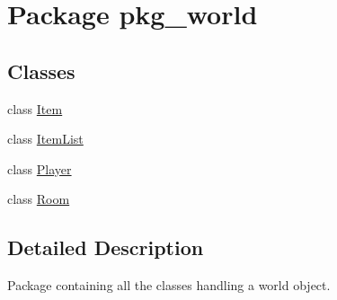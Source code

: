 \hypertarget{namespacepkg__world}{\section{Package pkg\-\_\-world}
\label{namespacepkg__world}
}
\subsection*{Classes}
\begin{DoxyCompactItemize}
\item 
class \hyperlink{classpkg__world_1_1Item}{Item}
\item 
class \hyperlink{classpkg__world_1_1ItemList}{Item\-List}
\item 
class \hyperlink{classpkg__world_1_1Player}{Player}
\item 
class \hyperlink{classpkg__world_1_1Room}{Room}
\end{DoxyCompactItemize}


\subsection{Detailed Description}
Package containing all the classes handling a world object. 